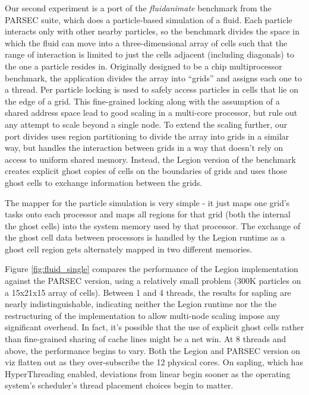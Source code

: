 Our second experiment is a port of the \emph{fluidanimate} benchmark from the PARSEC suite\cite{bienia11benchmarking},
which does a particle-based simulation of a fluid.  Each particle interacts only with other nearby
particles, so the benchmark divides the space in which the fluid
can move into a three-dimensional array of cells such that the range of interaction is limited to just the
cells adjacent (including diagonals) to the one a particle resides in.  Originally designed to be a
chip multiprocessor benchmark, the application divides the array into ``grids'' and assigns each one to 
a thread.  Per particle locking is used to safely access particles in cells that lie
on the edge of a grid.  This fine-grained locking along with the assumption of a shared address space lead to
good scaling in a multi-core processor, but rule out any attempt to scale beyond a single node.  To extend the
scaling further, our port divides uses region partitioning to divide the array into grids in a similar
way, but handles the interaction between grids in a way that doesn't rely on access to uniform shared memory.
Instead, the Legion version of the benchmark creates explicit ghost copies of cells on the boundaries of grids
and uses those ghost cells to exchange information between the grids.

The mapper for the particle simulation is very simple - it just maps one grid's tasks onto each processor and
maps all regions for that grid (both the internal the ghost cells) into the system memory used by that processor.
The exchange of the ghost cell data between processors is handled by the Legion runtime as a ghost cell region
gets alternately mapped in two different memories.

Figure \ref{fig:fluid_single} compares the performance of the Legion implementation against the PARSEC version,
using a relatively small problem (300K particles on a 15x21x15 array of cells).  Between 1 and 4 threads, the
results for sapling are nearly indistinguishable, indicating 
neither the Legion runtime nor the the restructuring of the implementation to allow multi-node scaling impose
any significant overhead.  In fact, it's possible that the use of explicit ghost cells rather than 
fine-grained sharing of cache lines might be a net win.  At 8 threads and above, the performance begins to vary.
Both the Legion and PARSEC version on viz flatten out as they over-subscribe the 12 physical cores.  On sapling,
which has HyperThreading enabled, deviations from linear begin sooner as the operating system's scheduler's
thread placement choices begin to matter.

